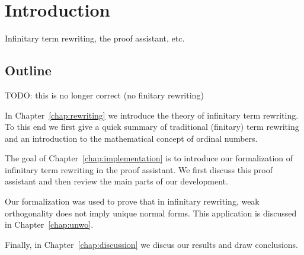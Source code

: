 \chapter{Introduction}

Infinitary term rewriting, the \Coq proof assistant, etc.


\section*{Outline}

TODO: this is no longer correct (no finitary rewriting)

In Chapter~\ref{chap:rewriting} we introduce the theory of infinitary term
rewriting. To this end we first give a quick summary of traditional (finitary)
term rewriting and an introduction to the mathematical concept of ordinal
numbers.

The goal of Chapter~\ref{chap:implementation} is to introduce our formalization
of infinitary term rewriting in the \Coq proof assistant. We first discuss this
proof assistant and then review the main parts of our development.

Our formalization was used to prove that in infinitary rewriting, weak
orthogonality does not imply unique normal forms. This application is
discussed in Chapter~\ref{chap:unwo}.

Finally, in Chapter~\ref{chap:discussion} we discus our results and draw
conclusions.
